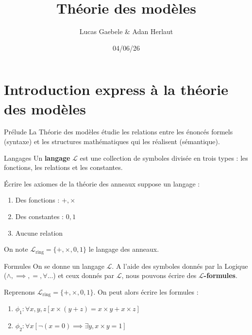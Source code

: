 \documentclass{beamer}
\title{Théorie des modèles}
\date{04/06/26}
\author{Lucas Gaebele \& Adan Herlaut}
\institute{Université Côte d'Azur}
\begin{document}
  \maketitle
  \section{Introduction express à la théorie des modèles}
\begin{frame}{Prélude}
    La Théorie des modèles étudie les relations entre les énoncés formels (syntaxe) et les structures mathématiques qui les réalisent (sémantique).
\end{frame}

\begin{frame}{Langages}
    Un \textbf{langage} $\mathcal{L}$ est une collection de symboles divisée en trois types : les fonctions, les relations et les constantes.
    \pause
    \begin{example}
    Écrire les axiomes de la théorie des anneaux suppose un langage :
    \begin{enumerate}
    \item Des fonctions : $+, \times$
    \item Des constantes : $0, 1$
    \item Aucune relation
    \end{enumerate}
    On note $\mathcal{L}_{\text{ring}} = \{+, \times, 0, 1\}$ le langage des anneaux.
    \end{example}
\end{frame}

\begin{frame}{Formules}
On se donne un langage $\mathcal{L}$. A l'aide des symboles donnés par la Logique ($\wedge, \implies, =, \forall$...) et ceux donnés par $\mathcal{L}$,
nous pouvons écrire des $\mathcal{L}$\textbf{-formules}.
\pause
\begin{example}
Reprenons $\mathcal{L}_{\text{ring}} = \{+, \times, 0, 1\}$.
On peut alors écrire les formules : 
\begin{enumerate}
\item $\phi_1 : \forall x,y,z [ x \times (y+z) = x \times y + x \times z ]$
\item $\phi_2 : \forall x [ \neg(x = 0) \implies \exists y, x \times y = 1 ]$
\end{enumerate}
\end{example}
\end{frame}
\end{document}
